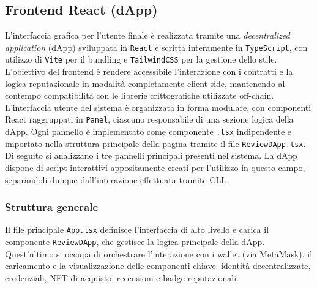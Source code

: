         \subsection{Frontend React (dApp)}
            L'interfaccia grafica per l'utente finale è realizzata tramite una \textit{decentralized application} (dApp) sviluppata in \texttt{React} e scritta interamente in \texttt{TypeScript}, con utilizzo di \texttt{Vite} per il bundling e \texttt{TailwindCSS} per la gestione dello stile. L'obiettivo del frontend è rendere accessibile l'interazione con i contratti e la logica reputazionale in modalità completamente client-side, mantenendo al contempo compatibilità con le librerie crittografiche utilizzate off-chain. L'interfaccia utente del sistema è organizzata in forma modulare, con componenti React raggruppati in \texttt{Panel}, ciascuno responsabile di una sezione logica della dApp. Ogni pannello è implementato come componente \texttt{.tsx} indipendente e importato nella struttura principale della pagina tramite il file \texttt{ReviewDApp.tsx}. Di seguito si analizzano i tre pannelli principali presenti nel sistema. La dApp dispone di script interattivi appositamente creati per l'utilizzo in questo campo, separandoli dunque dall'interazione effettuata tramite CLI. 

            \subsubsection{Struttura generale}
                \noindent Il file principale \texttt{App.tsx} definisce l'interfaccia di alto livello e carica il componente \texttt{ReviewDApp}, che gestisce la logica principale della dApp. Quest'ultimo si occupa di orchestrare l'interazione con i wallet (via MetaMask), il caricamento e la visualizzazione delle componenti chiave: identità decentralizzate, credenziali, NFT di acquisto, recensioni e badge reputazionali.

